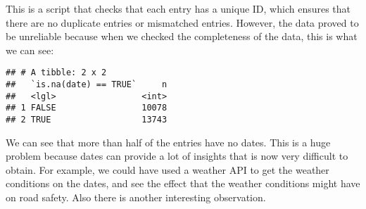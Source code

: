 \documentclass[
]{book}
\newenvironment{Shaded}{\begin{snugshade}}{\end{snugshade}}
\newcommand{\ControlFlowTok}[1]{\textcolor[rgb]{0.13,0.29,0.53}{\textbf{#1}}}
\newcommand{\DataTypeTok}[1]{\textcolor[rgb]{0.13,0.29,0.53}{#1}}
\newcommand{\DecValTok}[1]{\textcolor[rgb]{0.00,0.00,0.81}{#1}}
\newcommand{\KeywordTok}[1]{\textcolor[rgb]{0.13,0.29,0.53}{\textbf{#1}}}
\newcommand{\NormalTok}[1]{#1}
\newcommand{\OperatorTok}[1]{\textcolor[rgb]{0.81,0.36,0.00}{\textbf{#1}}}
\newcommand{\OtherTok}[1]{\textcolor[rgb]{0.56,0.35,0.01}{#1}}
\newcommand{\StringTok}[1]{\textcolor[rgb]{0.31,0.60,0.02}{#1}}
\begin{document}
\begin{Shaded}
\end{Shaded}

This is a script that checks that each entry has a unique ID, which ensures that there are no duplicate entries or mismatched entries. However, the data proved to be unreliable because when we checked the completeness of the data, this is what we can see:

\begin{Shaded}
\end{Shaded}

\begin{verbatim}
## # A tibble: 2 x 2
##   `is.na(date) == TRUE`     n
##   <lgl>                 <int>
## 1 FALSE                 10078
## 2 TRUE                  13743
\end{verbatim}

We can see that more than half of the entries have no dates. This is a huge problem because dates can provide a lot of insights that is now very difficult to obtain. For example, we could have used a weather API to get the weather conditions on the dates, and see the effect that the weather conditions might have on road safety. Also there is another interesting observation.
\end{document}
